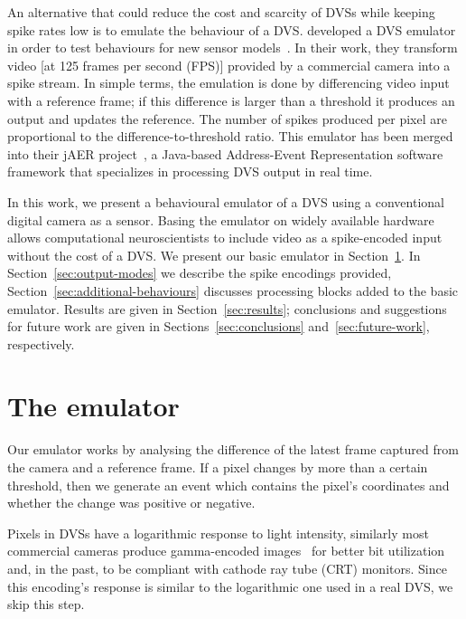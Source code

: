 \documentclass[conference]{IEEEtran}
\begin{document}
An alternative that could reduce the cost and scarcity of DVSs while keeping spike rates low is to emulate the behaviour of a DVS. \citeauthor{DVSemu} developed a DVS emulator in order to test behaviours for new sensor models~\cite{DVSemu}. In their work, they transform video [at 125 frames per second (FPS)] provided by a commercial camera into a spike stream. In simple terms, the emulation is done by differencing video input with a reference frame; if this difference is larger than a threshold it produces an output and updates the reference. The number of spikes produced per pixel are proportional to the difference-to-threshold ratio. This emulator has been merged into their jAER project~\cite{delbruck2008frame}, a Java-based Address-Event Representation software framework that specializes in processing DVS output in real time.

In this work, we present a behavioural emulator of a DVS using a conventional digital camera as a sensor. Basing the emulator on widely available hardware allows computational neuroscientists to include video as a spike-encoded input without the cost of a DVS. We present our basic emulator in Section~\ref{sec:basic-emulator}. In Section~\ref{sec:output-modes} we describe the spike encodings provided, Section~\ref{sec:additional-behaviours} discusses processing blocks added to the basic emulator. Results are given in Section~\ref{sec:results}; conclusions and suggestions for future work are given in Sections~\ref{sec:conclusions} and~\ref{sec:future-work}, respectively.


\section{The emulator}
\label{sec:basic-emulator}

Our emulator works by analysing the difference of the latest frame captured from the camera and a reference frame. If a pixel changes by more than a certain threshold, then we generate an event which contains the pixel's coordinates and whether the change was positive or negative. 

Pixels in DVSs have a logarithmic response to light intensity, similarly most commercial cameras produce gamma-encoded images~\cite{PoyntonDigitalVideo} for better bit utilization and, in the past, to be compliant with cathode ray tube (CRT) monitors.
Since this encoding's response is similar to the logarithmic one used in a real DVS, we skip this step.
\end{document}

